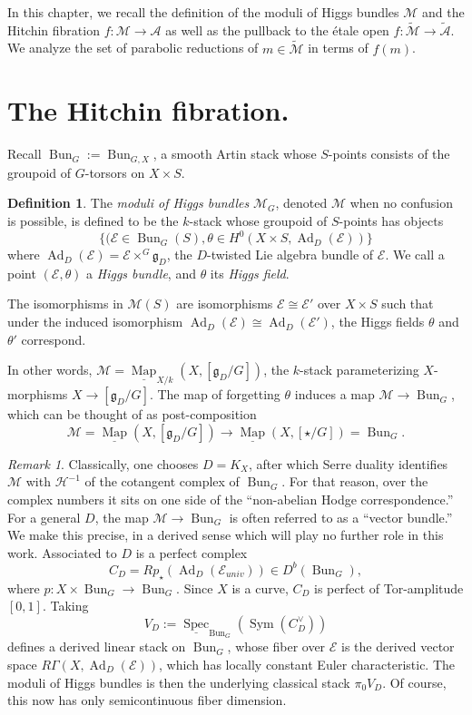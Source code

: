 \documentclass[openany]{amsbook}
\theoremstyle{definition}
\newtheorem{definition}[theorem]{Definition}
\theoremstyle{remark}
\newtheorem{remark}[theorem]{Remark}
\numberwithin{equation}{section}
\newcommand{\cA}{\mathcal{A}}
\newcommand{\cM}{\mathcal{M}}
\newcommand{\cE}{\mathcal{E}}
\newcommand{\ul}[1]{\underline{#1}}
\renewcommand{\-}{\operatorname{-}}
\newcommand{\Spec}{\operatorname{Spec}}
\newcommand{\Map}{\ul{\operatorname{Map}}}
\newcommand{\on}[1]{\operatorname{#1}}
\newcommand{\Sym}{\on{Sym}}
\newcommand{\ctM}{\widetilde{\cM}}
\newcommand{\ctA}{\widetilde{\cA}}
\renewcommand{\fg}{\mathfrak{g}}
\newcommand{\Ad}{\on{Ad}}
\newcommand{\Bun}{\on{Bun}}
\begin{document}
In this chapter, we recall the definition of the moduli of Higgs bundles $\cM$ and the Hitchin fibration $f : \cM \to \cA$ as well as the pullback to the \'etale open $f : \ctM \to \ctA$. We analyze the set of parabolic reductions of $m \in \ctM$ in terms of $f(m)$.

\section{The Hitchin fibration.}

Recall $\Bun_{G} := \Bun_{G,X}$, a smooth Artin stack whose $S$-points consists of the groupoid of $G$-torsors on $X \times S$. 

\begin{definition}\label{def.Higgs.bundles}
    The \emph{moduli of Higgs bundles} $\cM_G$, denoted $\cM$ when no confusion is possible, is defined to be the $k$-stack whose groupoid of $S$-points has objects
    $$
        \{(\cE \in \Bun_G(S), \theta \in H^0(X \times S, \Ad_D(\cE))\}
    $$
    where $\Ad_D(\cE) = \cE \times^G \fg_D$, the $D$-twisted Lie algebra bundle of $\cE$. We call a point $(\cE, \theta)$ a \emph{Higgs bundle}, and $\theta$ its \emph{Higgs field}.
    
    The isomorphisms in $\cM(S)$ are isomorphisms $\cE \cong \cE'$ over $X \times S$ such that under the induced isomorphism $\Ad_D(\cE) \cong \Ad_D(\cE')$, the Higgs fields $\theta$ and $\theta'$ correspond. 
\end{definition}
In other words, $\cM = \Map_{X/k}(X, [\fg_D/G])$, the $k$-stack parameterizing $X$-morphisms $X \to [\fg_D/G]$. The map of forgetting $\theta$ induces a map $\cM \to \Bun_G$, which can be thought of as post-composition
$$
    \cM = \Map(X, [\fg_D/G]) \to \Map(X, [\star/G]) = \Bun_G.
$$

\begin{remark}
Classically, one chooses $D = K_X$, after which Serre duality identifies $\cM$ with $\mathcal{H}^{-1}$ of the cotangent complex of $\Bun_G$. For that reason, over the complex numbers it sits on one side of the ``non-abelian Hodge correspondence.'' For a general $D$, the map $\cM \to \Bun_G$ is often referred to as a ``vector bundle.'' We make this precise, in a derived sense which will play no further role in this work. Associated to $D$ is a perfect complex 
$$
    C_D = Rp_\star(\Ad_D(\cE_{univ})) \in D^b(\Bun_G),
$$
where $p : X \times \Bun_G \to \Bun_G$. Since $X$ is a curve, $C_D$ is perfect of Tor-amplitude $[0,1]$. Taking $$V_D :=\ul{\Spec}_{\Bun_G}(\Sym(C^\vee_D))$$ defines a derived linear stack on $\Bun_G$, whose fiber over $\cE$ is the derived vector space $R \Gamma(X, \Ad_D(\cE))$, which has locally constant Euler characteristic. The moduli of Higgs bundles is then the underlying classical stack $\pi_0 V_D$. Of course, this now has only semicontinuous fiber dimension.
\end{remark}
\end{document}
